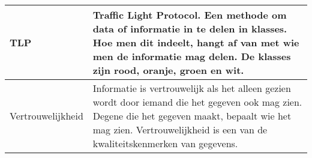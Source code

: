 \documentclass[11pt, a4paper]{report}
\begin{document}
\begin{longtable}{ p{}  p{} }
		TLP & Traffic Light Protocol. Een methode om data of informatie in te delen in klasses. Hoe men dit indeelt, hangt af van met wie men de informatie mag delen. De klasses zijn rood, oranje, groen en wit. \\ \midrule

		Vertrouwelijkheid & Informatie is vertrouwelijk als het alleen gezien wordt door iemand die het gegeven ook mag zien. Degene die het gegeven maakt, bepaalt wie het mag zien. Vertrouwelijkheid is een van de kwaliteitskenmerken van gegevens. \\ \midrule

	\bottomrule
\end{longtable}
\end{document}
